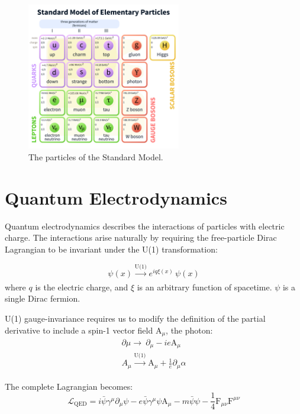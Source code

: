 \begin{figure}[htbp]
\centering
\includegraphics[width=0.6\textwidth]{figs/StandardModelofElementaryParticles.pdf}
\caption{The particles of the Standard Model.}
\label{fig:sm}
\end{figure}

\section{Quantum Electrodynamics}

Quantum electrodynamics describes the interactions of particles with electric charge. The interactions arise naturally by requiring the free-particle Dirac Lagrangian to be invariant under the U(1) transformation:

\begin{equation}
\psi(x)  \xrightarrow[]{\text{U(1)}} e^{i q \xi(x)}\,\psi(x)
\label{eq:u1}
\end{equation}
where $q$ is the electric charge, and $\xi$ is an arbitrary function of spacetime. $\psi$ is a single Dirac fermion.

U(1) gauge-invariance requires us to modify the definition of the partial derivative to include a spin-1 vector field $\mathrm{A}_{\mu}$, the photon:
\begin{equation}
\begin{array}{l}
\partial{\mu} \rightarrow\ \partial_{\mu} - ie\mathrm{A}_{\mu}
\\A_{\mu} \xrightarrow[]{\text{U(1)}} \mathrm{A}_{\mu} + \frac{1}{e} \partial_{\mu} \alpha
 \end{array}
\end{equation}

The complete Lagrangian becomes:
\begin{equation}
\mathcal{L}_{\mathrm{QED}} =
i\bar{\psi}\gamma^{\mu}\partial_{\mu}\psi
- e\bar{\psi}\gamma^{\mu}\psi \mathrm{A}_{\mu}
- m\bar{\psi}\psi
- \frac{1}{4}\mathrm{F}_{\mu\nu} \mathrm{F}^{\mu\nu}
\end{equation}


